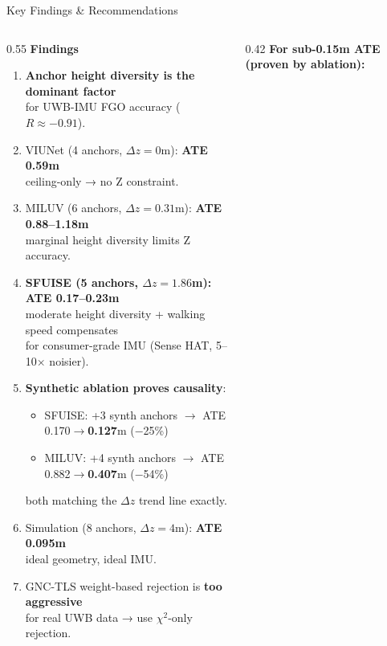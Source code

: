 \documentclass[10pt,aspectratio=169]{beamer}
\begin{document}
\begin{frame}{Key Findings \& Recommendations}
\centering
\begin{columns}
\begin{column}{0.55\textwidth}
\textbf{Findings}\\
\vspace{0.1cm}
\begin{enumerate}\setlength{\itemsep}{5pt}\footnotesize
    \item \textbf{Anchor height diversity is the dominant factor}\\
    for UWB-IMU FGO accuracy ($R \approx -0.91$).
    \item VIUNet (4 anchors, $\Delta z{=}0$m): \textbf{ATE 0.59m}\\
    ceiling-only → no Z constraint.
    \item MILUV (6 anchors, $\Delta z{=}0.31$m): \textbf{ATE 0.88--1.18m}\\
    marginal height diversity limits Z accuracy.
    \item \textbf{SFUISE (5 anchors, $\Delta z{=}1.86$m): ATE 0.17--0.23m}\\
    moderate height diversity + walking speed compensates\\
    for consumer-grade IMU (Sense HAT, 5--10$\times$ noisier).
    \item \textbf{Synthetic ablation proves causality}:
    \begin{itemize}\setlength{\itemsep}{1pt}\scriptsize
        \item SFUISE: +3 synth anchors $\to$ ATE 0.170$\to$\textbf{0.127}m ($-$25\%)
        \item MILUV: +4 synth anchors $\to$ ATE 0.882$\to$\textbf{0.407}m ($-$54\%)
    \end{itemize}
    both matching the $\Delta z$ trend line exactly.
    \item Simulation (8 anchors, $\Delta z{=}4$m): \textbf{ATE 0.095m}\\
    ideal geometry, ideal IMU.
    \item GNC-TLS weight-based rejection is \textbf{too aggressive}\\
    for real UWB data → use $\chi^2$-only rejection.
\end{enumerate}
\end{column}
\begin{column}{0.42\textwidth}
\textbf{For sub-0.15m ATE (proven by ablation):}\\

\end{column}
\end{columns}
\end{frame}
\end{document}
